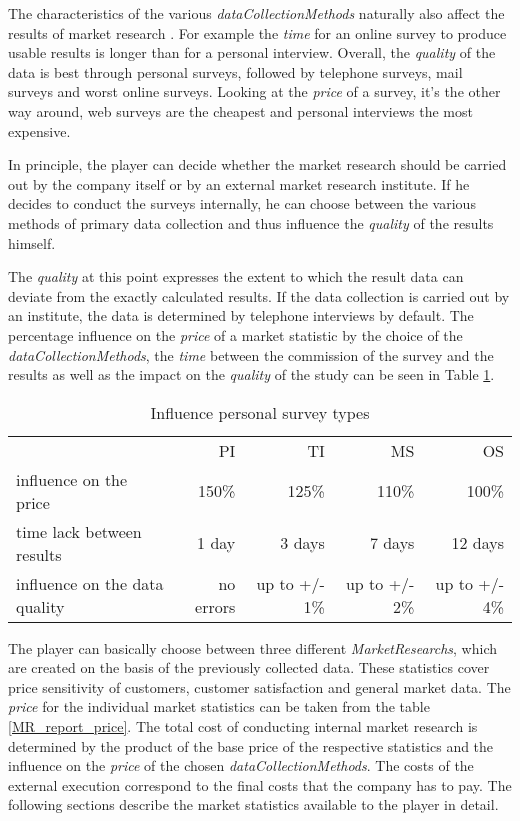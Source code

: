 The characteristics of the various \textit{dataCollectionMethods} naturally also affect the results of market research \cite[Chapter~4.4.2.1]{mooi_getting_2018}. For example the \textit{time} for an online survey to produce usable results is longer than for a personal interview. Overall, the \textit{quality} of the data is best through personal surveys, followed by telephone surveys, mail surveys and worst online surveys. Looking at the \textit{price} of a survey, it's the other way around, web surveys are the cheapest and personal interviews the most expensive. 

In principle, the player can decide whether the market research should be carried out by the company itself or by an external market research institute. If he decides to conduct the surveys internally, he can choose between the various methods of primary data collection and thus influence the \textit{quality} of the results himself. 

The \textit{quality} at this point expresses the extent to which the result data can deviate from the exactly calculated results. If the data collection is carried out by an institute, the data is determined by telephone interviews by default. The percentage influence on the \textit{price} of a market statistic by the choice of the \textit{dataCollectionMethods}, the \textit{time} between the commission of the survey and the results as well as the impact on the \textit{quality} of the study can be seen in Table \ref{MR_survey_types_influence}. 

\begin{table}[ht]
\centering
\begin{tabular}{|l|r|r|r|r|}
\hline
                                 & PI           & TI             & MS             & OS \\
influence on the price           & 150\%        & 125\%          & 110\%          & 100\%   \\
time lack between results        & 1 day        & 3 days         & 7 days         & 12 days   \\
influence on the data quality    & no errors    & up to +/- 1\%  & up to +/- 2\%  & up to +/- 4\%   \\
\hline
\end{tabular}
\caption{Influence personal survey types}
\label{MR_survey_types_influence}
\end{table}

The player can basically choose between three different \textit{MarketResearchs}, which are created on the basis of the previously collected data. These statistics cover price sensitivity of customers, customer satisfaction and general market data. 
The \textit{price} for the individual market statistics can be taken from the table \ref{MR_report_price}. The total cost of conducting internal market research is determined by the product of the base price of the respective statistics and the influence on the \textit{price} of the chosen \textit{dataCollectionMethods}. The costs of the external execution correspond to the final costs that the company has to pay. 
The following sections describe the market statistics available to the player in detail. \\

